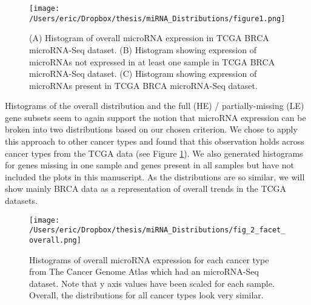 \documentclass[12pt]{report}
\begin{document}
\begin{figure}[H]
\centering
 \texttt{[image: /Users/eric/Dropbox/thesis/miRNA\_Distributions/figure1.png]}
  \caption{(A) Histogram of overall microRNA expression in TCGA BRCA microRNA-Seq dataset. 
  (B) Histogram showing expression of microRNAs not expressed
  in at least one sample in TCGA BRCA microRNA-Seq dataset.
  (C) Histogram showing expression of microRNAs present in TCGA BRCA microRNA-Seq dataset.}
\end{figure}

  Histograms of the overall distribution and the full (HE) / partially-missing (LE) gene subsets seem to again support the notion that microRNA expression
can be broken into two distributions based on our chosen criterion. We chose to apply this approach to other cancer types and found that this observation
holds across cancer types from the TCGA data (see Figure \ref{fig::all_tri_plots}). 
We also generated histograms for genes missing in one sample and genes present 
in all samples but have not included the plots in this manuscript. As the 
distributions are so similar, we will show mainly BRCA data as a representation 
of overall trends in the TCGA datasets.

\begin{figure}[H]
 \centering
\texttt{[image: /Users/eric/Dropbox/thesis/miRNA\_Distributions/fig\_2\_facet\_overall.png]}
 \caption{Histograms of overall microRNA expression for
 each cancer type from The Cancer Genome Atlas which had an microRNA-Seq dataset.
 Note that y axis values have been scaled for each sample. Overall, the distributions for
 all cancer types look very similar.}
 \label{fig::all_tri_plots}
\end{figure}


\end{document}
